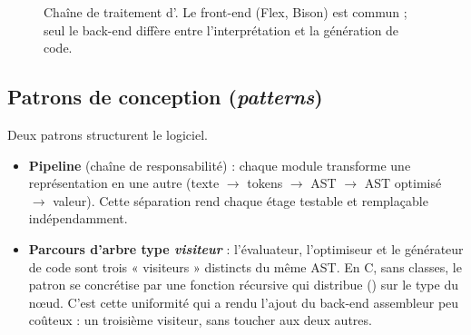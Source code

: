 \begin{figure}[ht]
\centering
{}
\caption{Chaîne de traitement d'\ilang. Le front-end (Flex, Bison) est commun ;
seul le back-end diffère entre l'interprétation et la génération de code.}
\label{fig:pipeline}
\end{figure}

\subsection{Patrons de conception (\emph{patterns})}

Deux patrons structurent le logiciel.

\begin{itemize}
  \item \textbf{Pipeline} (chaîne de responsabilité) : chaque module transforme
        une représentation en une autre (texte $\to$ tokens $\to$ AST $\to$ AST
        optimisé $\to$ valeur). Cette séparation rend chaque étage testable et
        remplaçable indépendamment.
  \item \textbf{Parcours d'arbre type \emph{visiteur}} : l'évaluateur, l'optimiseur
        et le générateur de code sont trois « visiteurs » distincts du même AST.
        En C, sans classes, le patron se concrétise par une fonction récursive qui
        distribue () sur le type du n\oe ud. C'est cette uniformité
        qui a rendu l'ajout du back-end assembleur peu coûteux : un troisième
        visiteur, sans toucher aux deux autres.
\end{itemize}

